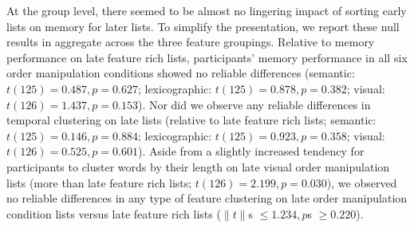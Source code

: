 \documentclass[11pt]{article}
\begin{document}
At the group level, there seemed to be almost no lingering impact of sorting
early lists on memory for later lists. To simplify the presentation, we report
these null results in aggregate across the three feature groupings. Relative to
memory performance on late feature rich lists, participants' memory performance
in all six order manipulation conditions showed no reliable differences
(semantic: $t(125) = 0.487, p = 0.627$; lexicographic: $t(125) = 0.878, p =
0.382$; visual: $t(126) = 1.437, p = 0.153$). Nor did we observe any reliable
differences in temporal clustering on late lists (relative to late feature rich
lists; semantic: $t(125) = 0.146, p = 0.884$; lexicographic: $t(125) = 0.923, p
= 0.358$; visual: $t(126) = 0.525, p = 0.601$). Aside from a slightly increased
tendency for participants to cluster words by their length on late visual order
manipulation lists (more than late feature rich lists; $t(126) = 2.199, p =
0.030$), we observed no reliable differences in any type of feature clustering
on late order manipulation condition lists versus late feature rich lists
($\|t\|$s $\leq 1.234, p$s $\geq 0.220$).
\end{document}

